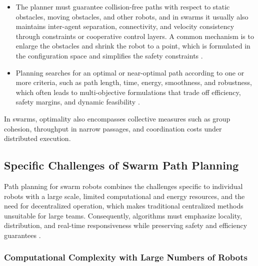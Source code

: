 \begin{itemize}
  \item {} The planner must guarantee collision-free paths
        with respect to static obstacles, moving obstacles, and other robots, and
        in swarms it usually also maintains inter-agent separation, connectivity,
        and velocity consistency through constraints or cooperative control
        layers. A common mechanism is to enlarge the obstacles and shrink the
        robot to a point, which is formulated in the configuration space and
        simplifies the safety constraints \cite{lin2022review,abujabal2024path}.
  \item {} Planning searches for an optimal or
        near-optimal path according to one or more criteria, such as path
        length, time, energy, smoothness, and robustness, which often leads to
        multi-objective formulations that trade off efficiency, safety margins,
        and dynamic feasibility \cite{nguyen2024swarm,lin2022review}.
\end{itemize}
In swarms, optimality also encompasses collective measures such as group
cohesion, throughput in narrow passages, and coordination costs under
distributed execution.

\subsection{Specific Challenges of Swarm Path Planning}

Path planning for swarm robots combines the challenges specific to individual
robots with a large scale, limited computational and energy resources, and the
need for decentralized operation, which makes traditional centralized methods
unsuitable for large teams. Consequently, algorithms must emphasize locality,
distribution, and real-time responsiveness while preserving safety and
efficiency guarantees \cite{nguyen2024swarm,lin2022review}.

\subsubsection{Computational Complexity with Large Numbers of Robots}


